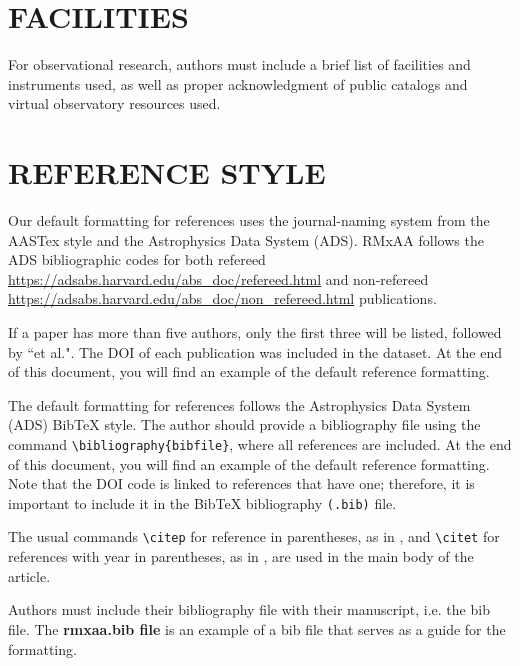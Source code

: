 \documentclass[9pt,twoside]{rmaa-rho-class/rmaa-rho}
\newcommand{\CS}[1]{\texttt{\textbackslash #1}}
\begin{document}

\section{FACILITIES}

For observational research, authors must include a brief list of facilities and instruments used, as well as proper acknowledgment of public catalogs and virtual observatory resources used.

\section{REFERENCE STYLE}

    Our default formatting for references uses the journal-naming system from the AASTex style and the Astrophysics Data System (ADS). RMxAA follows the ADS bibliographic codes for both refereed \url{https://adsabs.harvard.edu/abs_doc/refereed.html} and non-refereed \url{https://adsabs.harvard.edu/abs_doc/non_refereed.html} publications.
    
    If a paper has more than five authors, only the first three will be listed, followed by ``et al.". The DOI of each publication was included in the dataset. At the end of this document, you will find an example of the default reference formatting. 

    The default formatting for references follows the Astrophysics Data System (ADS) BibTeX style. The author should provide a bibliography file using the command \CS{bibliography}\verb|{bibfile}|, where all references are included. At the end of this document, you will find an example of the default reference formatting. Note that the DOI code is linked to references that have one; therefore, it is important to include it in the BibTeX bibliography \texttt{(.bib)} file.
    
    The usual commands \CS{citep} for reference in parentheses, as in \citep{Roman23},  and \CS{citet} for references with year in parentheses, as in \citet{Roman23}, are used in the main body of the article.

    Authors must include their bibliography file with their manuscript, i.e. the 
    bib file. The {\bf rmxaa.bib file} is an example of a bib file that serves as a guide for the formatting.

\renewcommand{\refname}{REFERENCES}


\end{document}
